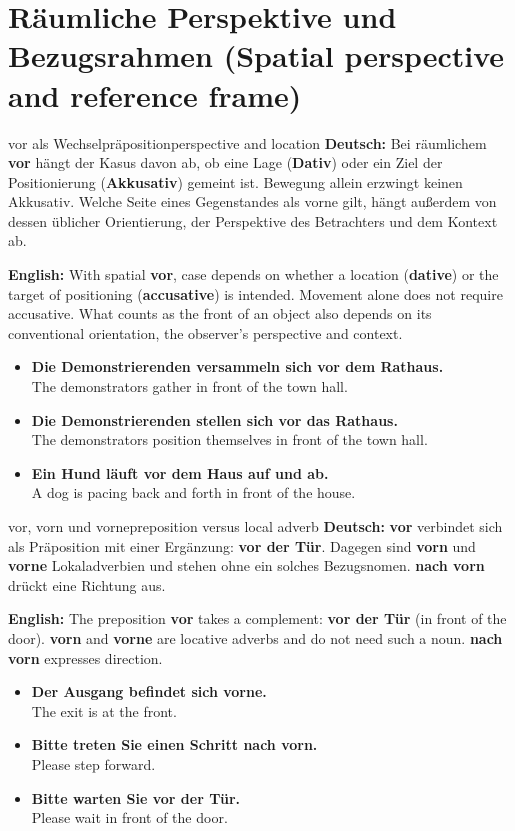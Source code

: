 \documentclass[a4paper,11pt]{article}
\newcommand{\GermanText}[1]{\textbf{Deutsch: }#1\par}
\newcommand{\EnglishText}[1]{{\small\color{SoftGray}\textbf{English: }#1\par}}
\newcommand{\ExampleItem}[2]{\item \textbf{#1}\\{\small\color{SoftGray}#2}}
\begin{document}
    \section{Räumliche Perspektive und Bezugsrahmen (Spatial perspective and reference frame)}
        \begin{grammarentry}{vor als Wechselpräposition}{perspective and location}
            \GermanText{Bei räumlichem \textbf{vor} hängt der Kasus davon ab, ob eine Lage (\textbf{Dativ}) oder ein Ziel der Positionierung (\textbf{Akkusativ}) gemeint ist. Bewegung allein erzwingt keinen Akkusativ. Welche Seite eines Gegenstandes als vorne gilt, hängt außerdem von dessen üblicher Orientierung, der Perspektive des Betrachters und dem Kontext ab.}
            \EnglishText{With spatial \textbf{vor}, case depends on whether a location (\textbf{dative}) or the target of positioning (\textbf{accusative}) is intended. Movement alone does not require accusative. What counts as the front of an object also depends on its conventional orientation, the observer's perspective and context.}
        \end{grammarentry}
        \begin{exbox}
            \begin{itemize}
                \ExampleItem{Die Demonstrierenden versammeln sich vor dem Rathaus.}{The demonstrators gather in front of the town hall.}
                \ExampleItem{Die Demonstrierenden stellen sich vor das Rathaus.}{The demonstrators position themselves in front of the town hall.}
                \ExampleItem{Ein Hund läuft vor dem Haus auf und ab.}{A dog is pacing back and forth in front of the house.}
            \end{itemize}
        \end{exbox}
        \begin{grammarentry}{vor, vorn und vorne}{preposition versus local adverb}
            \GermanText{\textbf{vor} verbindet sich als Präposition mit einer Ergänzung: \textbf{vor der Tür}. Dagegen sind \textbf{vorn} und \textbf{vorne} Lokaladverbien und stehen ohne ein solches Bezugsnomen. \textbf{nach vorn} drückt eine Richtung aus.}
            \EnglishText{The preposition \textbf{vor} takes a complement: \textbf{vor der Tür} (in front of the door). \textbf{vorn} and \textbf{vorne} are locative adverbs and do not need such a noun. \textbf{nach vorn} expresses direction.}
        \end{grammarentry}
        \begin{exbox}
            \begin{itemize}
                \ExampleItem{Der Ausgang befindet sich vorne.}{The exit is at the front.}
                \ExampleItem{Bitte treten Sie einen Schritt nach vorn.}{Please step forward.}
                \ExampleItem{Bitte warten Sie vor der Tür.}{Please wait in front of the door.}
            \end{itemize}
        \end{exbox}
\end{document}
